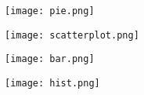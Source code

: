 \documentclass{article}
\begin{document}
\begin{figure}[htbp]
\centerline{\texttt{[image: pie.png]}}
\centerline{\texttt{[image: scatterplot.png]}}

\end{figure}
\newpage
\begin{figure}[htbp]
\centerline{\texttt{[image: bar.png]}}
\centerline{\texttt{[image: hist.png]}}

\end{figure}
\end{document}
